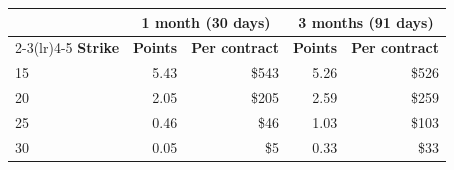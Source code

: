 \begin{tabular}{@{}lrrrr@{}}
\toprule
& \multicolumn{2}{c}{\textbf{1 month (30 days)}} & \multicolumn{2}{c}{\textbf{3 months (91 days)}}\\
\cmidrule(lr){2-3}\cmidrule(lr){4-5}
\textbf{Strike} & \textbf{Points} & \textbf{Per contract} & \textbf{Points} & \textbf{Per contract}\\
\midrule
15 & 5.43 & \$543 & 5.26 & \$526 \\
20 & 2.05 & \$205 & 2.59 & \$259 \\
25 & 0.46 & \$46 & 1.03 & \$103 \\
30 & 0.05 & \$5 & 0.33 & \$33 \\
\bottomrule
\end{tabular}
